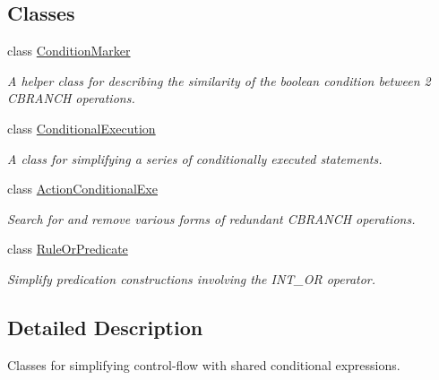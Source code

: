 \subsection*{Classes}
\begin{DoxyCompactItemize}
\item 
class \mbox{\hyperlink{class_condition_marker}{Condition\+Marker}}
\begin{DoxyCompactList}\small\item\em A helper class for describing the similarity of the boolean condition between 2 C\+B\+R\+A\+N\+CH operations. \end{DoxyCompactList}\item 
class \mbox{\hyperlink{class_conditional_execution}{Conditional\+Execution}}
\begin{DoxyCompactList}\small\item\em A class for simplifying a series of conditionally executed statements. \end{DoxyCompactList}\item 
class \mbox{\hyperlink{class_action_conditional_exe}{Action\+Conditional\+Exe}}
\begin{DoxyCompactList}\small\item\em Search for and remove various forms of redundant C\+B\+R\+A\+N\+CH operations. \end{DoxyCompactList}\item 
class \mbox{\hyperlink{class_rule_or_predicate}{Rule\+Or\+Predicate}}
\begin{DoxyCompactList}\small\item\em Simplify predication constructions involving the I\+N\+T\+\_\+\+OR operator. \end{DoxyCompactList}\end{DoxyCompactItemize}


\subsection{Detailed Description}
Classes for simplifying control-\/flow with shared conditional expressions. 

